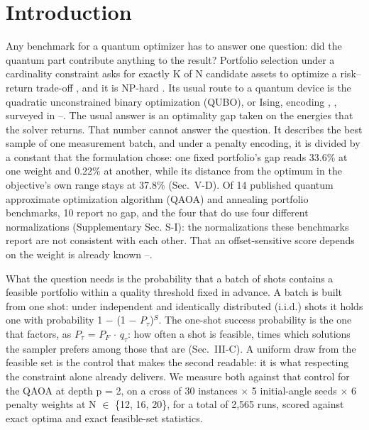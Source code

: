 \documentclass{ieeeaccess}
\begin{document}
\titlepgskip=-15pt

\maketitle


\section{Introduction}


Any benchmark for a quantum optimizer has to answer one question: did the quantum part contribute anything to the result? Portfolio selection under a cardinality constraint asks for exactly K of N candidate assets to optimize a risk--return trade-off \cite{ref1}, and it is NP-hard \cite{ref2}. Its usual route to a quantum device is the quadratic unconstrained binary optimization (QUBO), or Ising, encoding \cite{ref3}, \cite{ref4}, surveyed in \cite{ref5}--\cite{ref7}. The usual answer is an optimality gap taken on the energies that the solver returns. That number cannot answer the question. It describes the best sample of one measurement batch, and under a penalty encoding, it is divided by a constant that the formulation chose: one fixed portfolio's gap reads 33.6\% at one weight and 0.22\% at another, while its distance from the optimum in the objective's own range stays at 37.8\% (Sec.~V-D). Of 14 published quantum approximate optimization algorithm (QAOA) and annealing portfolio benchmarks, 10 report no gap, and the four that do use four different normalizations (Supplementary Sec. S-I): the normalizations these benchmarks report are not consistent with each other. That an offset-sensitive score depends on the weight is already known \cite{ref8}--\cite{ref10}.


What the question needs is the probability that a batch of shots contains a feasible portfolio within a quality threshold fixed in advance. A batch is built from one shot: under independent and identically distributed (i.i.d.) shots it holds one with probability 1 $-$ (1 $-$ $P_{\tau}$)$^{S}$. The one-shot success probability is the one that factors, as $P_{\tau}$ = $P_{F}$ $\cdot$ $q_{\tau}$: how often a shot is feasible, times which solutions the sampler prefers among those that are (Sec.~III-C). A uniform draw from the feasible set is the control that makes the second readable: it is what respecting the constraint alone already delivers. We measure both against that control for the QAOA at depth p = 2, on a cross of 30 instances $\times$ 5 initial-angle seeds $\times$ 6 penalty weights at N $\in$ \{12, 16, 20\}, for a total of 2,565 runs, scored against exact optima and exact feasible-set statistics.
\end{document}
